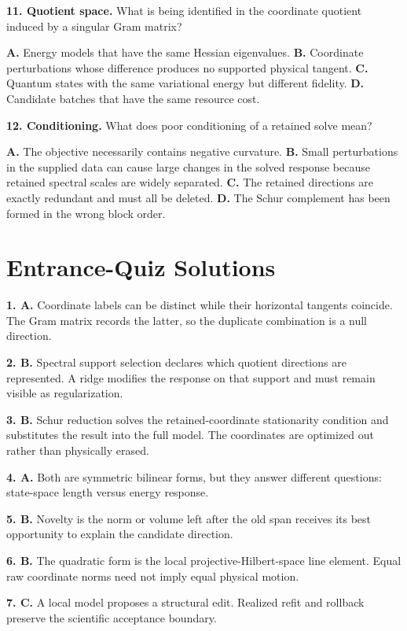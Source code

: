 \documentclass[10pt,twocolumn]{article}
\begin{document}
\textbf{11. Quotient space.}
What is being identified in the coordinate quotient induced by a singular Gram
matrix?

\textbf{A.} Energy models that have the same Hessian eigenvalues. \quad
\textbf{B.} Coordinate perturbations whose difference produces no supported
physical tangent. \quad
\textbf{C.} Quantum states with the same variational energy but different
fidelity. \quad
\textbf{D.} Candidate batches that have the same resource cost.

\textbf{12. Conditioning.}
What does poor conditioning of a retained solve mean?

\textbf{A.} The objective necessarily contains negative curvature. \quad
\textbf{B.} Small perturbations in the supplied data can cause large changes in
the solved response because retained spectral scales are widely separated. \quad
\textbf{C.} The retained directions are exactly redundant and must all be
deleted. \quad
\textbf{D.} The Schur complement has been formed in the wrong block order.

\clearpage
\section*{Entrance-Quiz Solutions}

\textbf{1. A.} Coordinate labels can be distinct while their horizontal
tangents coincide. The Gram matrix records the latter, so the duplicate
combination is a null direction.

\textbf{2. B.} Spectral support selection declares which quotient directions
are represented. A ridge modifies the response on that support and must remain
visible as regularization.

\textbf{3. B.} Schur reduction solves the retained-coordinate stationarity
condition and substitutes the result into the full model. The coordinates are
optimized out rather than physically erased.

\textbf{4. A.} Both are symmetric bilinear forms, but they answer different
questions: state-space length versus energy response.

\textbf{5. B.} Novelty is the norm or volume left after the old span receives
its best opportunity to explain the candidate direction.

\textbf{6. B.} The quadratic form is the local projective-Hilbert-space line
element. Equal raw coordinate norms need not imply equal physical motion.

\textbf{7. C.} A local model proposes a structural edit. Realized refit and
rollback preserve the scientific acceptance boundary.
\end{document}
